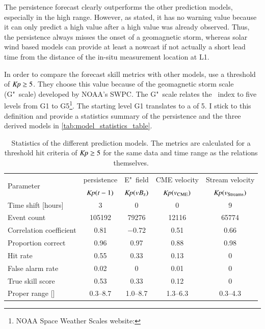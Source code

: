 The persistence forecast clearly outperforms the other prediction models, especially in the high \Kp{} range. However, as \citet{Detman1999} stated, it has no warning value because it can only predict a high \Kp{} value after a high \Kp{} value was already observed. Thus, the persistence always misses the onset of a geomagnetic storm, whereas solar wind based models can provide at least a nowcast if not actually a short lead time from the distance of the in-situ measurement location at L1.

In order to compare the \Kp{} forecast skill metrics with other models, \citet{Savani2017} use a threshold of $\textit{Kp}{} \geq 5$. They choose this value because of the geomagnetic storm scale (G"~scale) developed by NOAA's SWPC. The G"~scale relates the \Kp~index to five levels from G1 to G5\footnote{NOAA Space Weather Scales website: }. The starting level G1 translates to a \Kp{} of 5. I stick to this definition and provide a statistics summary of the \Kp{} persistence and the three derived models in \autoref{tab:model_statistics_table}.
\begin{table}[htb]
	\caption{Statistics of the different prediction models. The metrics are calculated for a threshold hit criteria of $\textit{Kp}{} \geq 5$ for the same data and time range as the relations themselves.}
	\label{tab:model_statistics_table}
	\centering
	\begin{tabular}{lcccc}
		\hline\hline
		\multirow{2}{*}{Parameter}	&\Kp{} persistence	&E"~field	&CME velocity 	&Stream velocity\\
			&$\textit{Kp}(t-1)$	&$\textit{Kp}(\text{$vB_\text{z}$})$	&$\textit{Kp}(v_\text{CME})$	&$\textit{Kp}(v_\text{Streams})$\\
		\hline
		Time shift [hours]	&3	&0	&0	&9\\
		Event count	&\num{105192}	&\num{79276}	&\num{12116}	&\num{65774}\\
		Correlation coefficient	&0.81	&\num{-0.72}	&0.51	&0.66\\
		\hline
		Proportion correct	&0.96	&0.97	&0.88	&0.98\\
		Hit rate	&0.55	&0.33	&0.13	&0\\
		False alarm rate	&0.02	&0	&0.01	&0\\
		True skill score	&0.53	&0.33	&0.12	&0\\
		Proper range [\Kp{}]	&\numrange{0.3}{8.7}	&\numrange{1.0}{8.7}	&\numrange{1.3}{6.3}	&\numrange{0.3}{4.3}\\
		\hline
	\end{tabular}
\end{table}

